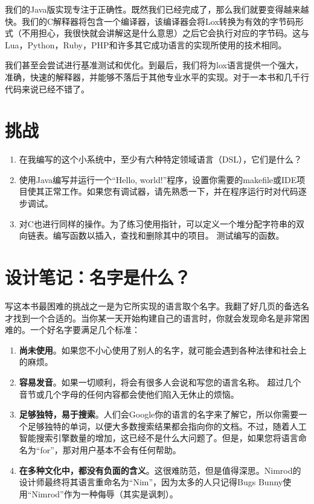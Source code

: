 \documentclass[cn,11pt,chinese]{elegantbook}
\begin{document}
我们的Java版实现专注于正确性。既然我们已经完成了，那么我们就要变得越来越快。我们的C解释器将包含一个编译器，该编译器会将Lox转换为有效的字节码形式（不用担心，我很快就会讲解这是什么意思）之后它会执行对应的字节码。这与Lua，Python，Ruby，PHP和许多其它成功语言的实现所使用的技术相同。

我们甚至会尝试进行基准测试和优化。到最后，我们将为lox语言提供一个强大，准确，快速的解释器，并能够不落后于其他专业水平的实现。对于一本书和几千行代码来说已经不错了。

\section{挑战}

\begin{enumerate}
  \item 在我编写的这个小系统中，至少有六种特定领域语言（DSL），它们是什么？
  \item 使用Java编写并运行一个“Hello, world!”程序，设置你需要的makefile或IDE项目使其正常工作。如果您有调试器，请先熟悉一下，并在程序运行时对代码逐步调试。
  \item 对C也进行同样的操作。为了练习使用指针，可以定义一个堆分配字符串的双向链表。编写函数以插入，查找和删除其中的项目。 测试编写的函数。
\end{enumerate}

\section{设计笔记：名字是什么？}

写这本书最困难的挑战之一是为它所实现的语言取个名字。我翻了好几页的备选名才找到一个合适的。当你某一天开始构建自己的语言时，你就会发现命名是非常困难的。一个好名字要满足几个标准：

\begin{enumerate}
  \item \textbf{尚未使用}。如果您不小心使用了别人的名字，就可能会遇到各种法律和社会上的麻烦。
  \item \textbf{容易发音}。如果一切顺利，将会有很多人会说和写您的语言名称。 超过几个音节或几个字母的任何内容都会使他们陷入无休止的烦恼。
  \item \textbf{足够独特，易于搜索}。人们会Google你的语言的名字来了解它，所以你需要一个足够独特的单词，以便大多数搜索结果都会指向你的文档。不过，随着人工智能搜索引擎数量的增加，这已经不是什么大问题了。但是，如果您将语言命名为“for”，那对用户基本不会有任何帮助。
  \item \textbf{在多种文化中，都没有负面的含义}。这很难防范，但是值得深思。Nimrod的设计师最终将其语言重命名为“Nim”，因为太多的人只记得Bugs Bunny使用“Nimrod”作为一种侮辱（其实是讽刺）。
\end{enumerate}
\end{document}
